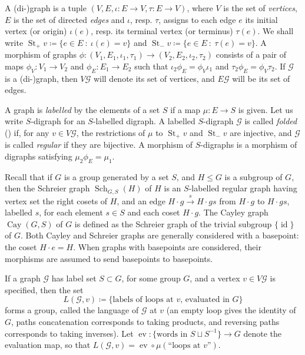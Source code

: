 \documentclass[ALCO,ThmDefs,Unicode,epreuves]{cedram}
\newcommand{\cG}{\mathcal{G}}
\DeclareMathOperator{\St}{St}
\DeclareMathOperator{\Sch}{Sch}
\DeclareMathOperator{\Cay}{Cay}
\DeclareMathOperator{\ev}{ev}
\DeclareMathOperator{\id}{id}
\begin{document}
\begin{defi}
A (di-)graph is a tuple $(V,E,{\iota}:E\to V,{\tau}:E\to V)$, where $V$ is the set of \emph{vertices}, $E$ is the set of directed \emph{edges} and ${\iota}$, resp. ${\tau}$, assigns to each edge $e$ its initial vertex (or origin) ${\iota}(e)$, resp. its terminal vertex (or terminus) ${\tau}(e)$. We shall write $\St_+v \coloneqq \{e\in E\ :\ {\iota}(e) = v\}$ and $\St_-v \coloneqq \{e\in E\ :\ {\tau}(e) = v\}$. A morphism of graphs ${\phi}:(V_{1},E_{1},{\iota}_{1},{\tau}_{1}) \to (V_{2},E_{2},{\iota}_{2},{\tau}_{2})$ consists of a pair of maps ${\phi}_V:V_{1}\to V_{2}$ and ${\phi}_E:E_{1}\to E_{2}$ such that ${\iota}_{2}{\phi}_E = {\phi}_V{\iota}_{1}$ and ${\tau}_{2}{\phi}_E = {\phi}_V{\tau}_{2}$. If $\cG$ is a (di-)graph, then $V\cG$ will denote its set of vertices, and $E\cG$ will be its set of edges.

A graph is \emph{labelled} by the elements of a set $S$ if a map ${\mu}:E\to S$ is given. Let us write $S$-digraph for an $S$-labelled digraph. A labelled $S$-digraph $\cG$ is called \emph{folded} {\upshape(}\cf \cite{St}{\upshape)} if, for any $v \in V\cG$, the restrictions of ${\mu}$ to $\St_+v$ and $\St_-v$ are injective, and $\cG$ is called \emph{regular} if they are bijective. A morphism of $S$-digraphs is a morphism of digraphs satisfying ${\mu}_{2}{\phi}_E = {\mu}_{1}$.
\end{defi}

Recall that if $G$ is a group generated by a set $S$, and $H\leq G$ is a subgroup of $G$, then the Schreier graph $\Sch_{G,S}(H)$ of $H$ is an $S$-labelled regular graph having vertex set the right cosets of $H$, and an edge $H\cdot g \xrightarrow{s} H\cdot gs$ from $H\cdot g$ to $H\cdot gs$, labelled $s$, for each element $s\in S$ and each coset $H\cdot g$. The Cayley graph $\Cay(G, S)$ of $G$ is defined as the Schreier graph of the trivial subgroup $\{ \id \}$ of $G$. Both Cayley and Schreier graphs are generally considered with a basepoint: the coset $H\cdot e = H$. When graphs with basepoints are considered, their morphisms are assumed to send basepoints to basepoints.

If a graph $\mathcal{G}$ has label set $S \subset G$, for some group $G$, and a vertex $v \in V\cG$ is specified, then the set
\[
 L(\mathcal{G},v) \coloneqq \{\text{labels of loops at $v$, evaluated in $G$}\}
\]
forms a group, called the language of $\mathcal{G}$ at $v$ (an empty loop gives the identity of $G$, paths concatenation corresponds to taking products, and reversing paths corresponds to taking inverses). Let $\ev : \{\text{words in }S \sqcup S^{-1}\} \to G$ denote the evaluation map, so that $L(\mathcal{G},v) = \ev {\circ}{\mu}\left(\text{``loops at $v$''}\right)$. 
\end{document}
